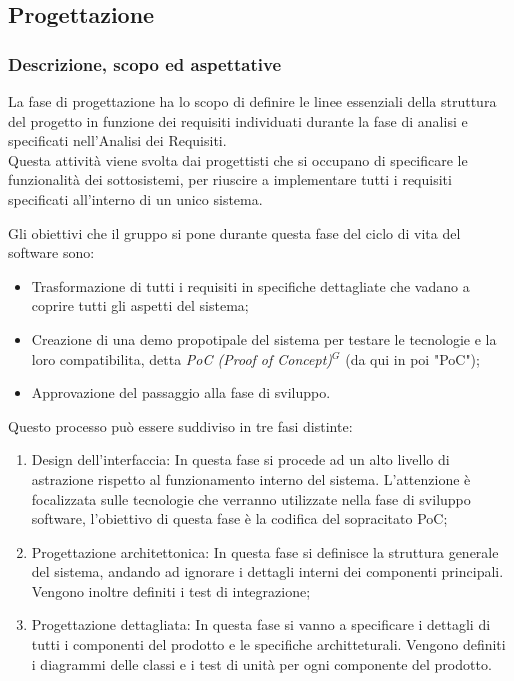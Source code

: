 \subsection{Progettazione}

\subsubsection{Descrizione, scopo ed aspettative}
La fase di progettazione ha lo scopo di definire le linee essenziali della struttura del progetto in funzione dei requisiti individuati durante la fase di analisi e specificati nell’Analisi dei Requisiti. \\
Questa attività viene svolta dai progettisti che si occupano di specificare le funzionalità dei sottosistemi, per riuscire a implementare tutti i requisiti specificati all'interno di un unico sistema.

Gli obiettivi che il gruppo si pone durante questa fase del ciclo di vita del software sono:
\begin{itemize}
    \item Trasformazione di tutti i requisiti in specifiche dettagliate che vadano a coprire tutti gli aspetti del sistema;
    \item Creazione di una demo propotipale del sistema per testare le tecnologie e la loro compatibilita, detta \emph{PoC (Proof of Concept)}$^{G}$ (da qui in poi "PoC");
    \item Approvazione del passaggio alla fase di sviluppo.
\end{itemize}

Questo processo può essere suddiviso in tre fasi distinte:
\begin{enumerate}
    \item Design dell'interfaccia: In questa fase si procede ad un alto livello di astrazione rispetto al funzionamento interno del sistema. L'attenzione è focalizzata sulle tecnologie che verranno utilizzate nella fase di sviluppo software, l'obiettivo di questa fase è la codifica del sopracitato PoC;
    \item Progettazione architettonica: In questa fase si definisce la struttura generale del sistema, andando ad ignorare i dettagli interni dei componenti principali. Vengono inoltre definiti i test di integrazione;
    \item Progettazione dettagliata: In questa fase si vanno a specificare i dettagli di tutti i componenti del prodotto e le specifiche architteturali. Vengono definiti i diagrammi delle classi e i test di unità per ogni componente del prodotto.
\end{enumerate}
